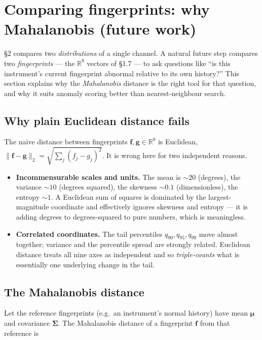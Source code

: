 \documentclass[11pt]{article}
\theoremstyle{definition}
\newcommand{\R}{\mathbb{R}}
\newcommand{\fvec}{\mathbf{f}}
\newcommand{\Cov}{\boldsymbol{\Sigma}}
\begin{document}
\section{Comparing fingerprints: why Mahalanobis (future work)}

\S2 compares two \emph{distributions} of a single channel. A natural future step compares two
\emph{fingerprints} --- the $\R^9$ vectors of \S1.7 --- to ask questions like ``is this instrument's
current fingerprint abnormal relative to its own history?'' This section explains why the
\emph{Mahalanobis} distance is the right tool for that question, and why it suits anomaly scoring
better than nearest-neighbour search.

\subsection{Why plain Euclidean distance fails}

The naive distance between fingerprints $\fvec, \mathbf{g} \in \R^9$ is Euclidean,
$\|\fvec - \mathbf{g}\|_2 = \sqrt{\sum_j (f_j - g_j)^2}$. It is wrong here for two independent reasons.

\begin{itemize}[leftmargin=1.4em, itemsep=0.3em]
  \item \textbf{Incommensurable scales and units.} The mean is $\sim 20$ (degrees), the variance
        $\sim 10$ (degrees squared), the skewness $\sim 0.1$ (dimensionless), the entropy $\sim 1$.
        A Euclidean sum of squares is dominated by the largest-magnitude coordinate and effectively
        ignores skewness and entropy --- it is adding degrees to degrees-squared to pure numbers,
        which is meaningless.
  \item \textbf{Correlated coordinates.} The tail percentiles $q_{90}, q_{95}, q_{99}$ move almost
        together; variance and the percentile spread are strongly related. Euclidean distance treats
        all nine axes as independent and so \emph{triple-counts} what is essentially one underlying
        change in the tail.
\end{itemize}

\subsection{The Mahalanobis distance}

Let the reference fingerprints (e.g.\ an instrument's normal history) have mean $\boldsymbol{\mu}$
and covariance $\Cov$. The Mahalanobis distance of a fingerprint $\fvec$ from that reference is
\end{document}

